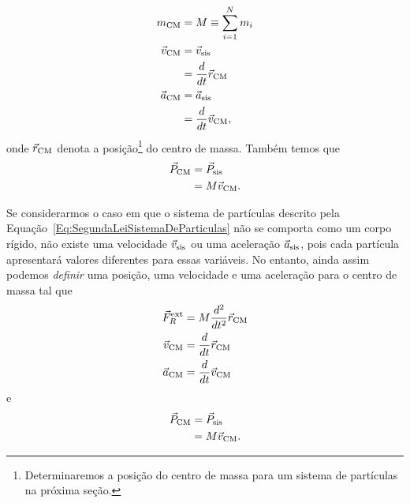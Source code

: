 \begin{align}
    m_{\rm{CM}} &= M \equiv \sum_{i=1}^N m_i \\
    \vec{v}_{\rm{CM}} &= \vec{v}_{\rm{sis}} \\
    &= \frac{d}{dt} \vec{r}_{\rm{CM}} \\
    \vec{a}_{\rm{CM}} &= \vec{a}_{\rm{sis}} \\
    &= \frac{d}{dt} \vec{v}_{\rm{CM}},
\end{align}
%
onde $\vec{r}_{\rm{CM}}$ denota a posição\footnote{Determinaremos a posição do centro de massa para um sistema de partículas na próxima seção.} do centro de massa. Também temos que
\begin{align}
    \vec{P}_{\rm{CM}} &= \vec{P}_{\rm{sis}} \\
    &= M \vec{v}_{\rm{CM}}.
\end{align}
    
Se considerarmos o caso em que o sistema de partículas descrito pela Equação~\eqref{Eq:SegundaLeiSistemaDeParticulas} não se comporta como um corpo rígido, não existe uma velocidade $\vec{v}_{\rm{sis}}$ ou uma aceleração $\vec{a}_{\rm{sis}}$, pois cada partícula apresentará valores diferentes para essas variáveis. No entanto, ainda assim podemos \emph{definir} uma posição, uma velocidade e uma aceleração para o centro de massa tal que
\begin{align}
    \vec{F}_{R}^{\rm{ext}} &= M\frac{d^2}{dt^2}\vec{r}_{\rm{CM}} \label{Eq:defPosCMEmTermosDeForcaRes} \\
    \vec{v}_{\rm{CM}} &= \frac{d}{dt}\vec{r}_{\rm{CM}} \\
    \vec{a}_{\rm{CM}} &= \frac{d}{dt}\vec{v}_{\rm{CM}}
\end{align}
%
e
\begin{align}
    \vec{P}_{\rm{CM}} &= \vec{P}_{\rm{sis}} \\
    &= M \vec{v}_{\rm{CM}}.
\end{align}

